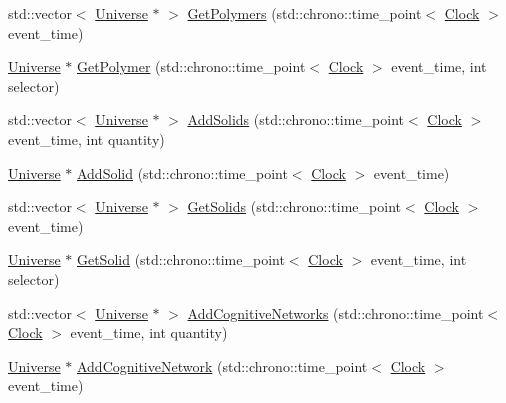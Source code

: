 \begin{DoxyCompactItemize}
\item 
std\+::vector$<$ \mbox{\hyperlink{classUniverse}{Universe}} $\ast$ $>$ \mbox{\hyperlink{classUniverse_aac5d1c1a3a3ba56c8ca7115a85b2c239}{Get\+Polymers}} (std\+::chrono\+::time\+\_\+point$<$ \mbox{\hyperlink{universe_8h_a0ef8d951d1ca5ab3cfaf7ab4c7a6fd80}{Clock}} $>$ event\+\_\+time)
\item 
\mbox{\hyperlink{classUniverse}{Universe}} $\ast$ \mbox{\hyperlink{classUniverse_a2d5d3924a7d7ffd2a5f47be9f137d86e}{Get\+Polymer}} (std\+::chrono\+::time\+\_\+point$<$ \mbox{\hyperlink{universe_8h_a0ef8d951d1ca5ab3cfaf7ab4c7a6fd80}{Clock}} $>$ event\+\_\+time, int selector)
\item 
std\+::vector$<$ \mbox{\hyperlink{classUniverse}{Universe}} $\ast$ $>$ \mbox{\hyperlink{classUniverse_a410d5ba2224fe90584b1f1aa5b38b41c}{Add\+Solids}} (std\+::chrono\+::time\+\_\+point$<$ \mbox{\hyperlink{universe_8h_a0ef8d951d1ca5ab3cfaf7ab4c7a6fd80}{Clock}} $>$ event\+\_\+time, int quantity)
\item 
\mbox{\hyperlink{classUniverse}{Universe}} $\ast$ \mbox{\hyperlink{classUniverse_a598799e2fcdf9ed60e83e9f5a61bfc05}{Add\+Solid}} (std\+::chrono\+::time\+\_\+point$<$ \mbox{\hyperlink{universe_8h_a0ef8d951d1ca5ab3cfaf7ab4c7a6fd80}{Clock}} $>$ event\+\_\+time)
\item 
std\+::vector$<$ \mbox{\hyperlink{classUniverse}{Universe}} $\ast$ $>$ \mbox{\hyperlink{classUniverse_a669fc068dd7820a5af309bfbe67199aa}{Get\+Solids}} (std\+::chrono\+::time\+\_\+point$<$ \mbox{\hyperlink{universe_8h_a0ef8d951d1ca5ab3cfaf7ab4c7a6fd80}{Clock}} $>$ event\+\_\+time)
\item 
\mbox{\hyperlink{classUniverse}{Universe}} $\ast$ \mbox{\hyperlink{classUniverse_a9f7b74fc21d45ddaa78aa18e9a337bcd}{Get\+Solid}} (std\+::chrono\+::time\+\_\+point$<$ \mbox{\hyperlink{universe_8h_a0ef8d951d1ca5ab3cfaf7ab4c7a6fd80}{Clock}} $>$ event\+\_\+time, int selector)
\item 
std\+::vector$<$ \mbox{\hyperlink{classUniverse}{Universe}} $\ast$ $>$ \mbox{\hyperlink{classUniverse_a5199f6c27b1a97c8b8c9847b8be686cf}{Add\+Cognitive\+Networks}} (std\+::chrono\+::time\+\_\+point$<$ \mbox{\hyperlink{universe_8h_a0ef8d951d1ca5ab3cfaf7ab4c7a6fd80}{Clock}} $>$ event\+\_\+time, int quantity)
\item 
\mbox{\hyperlink{classUniverse}{Universe}} $\ast$ \mbox{\hyperlink{classUniverse_ab682307c963836cd81b35b5604bd7064}{Add\+Cognitive\+Network}} (std\+::chrono\+::time\+\_\+point$<$ \mbox{\hyperlink{universe_8h_a0ef8d951d1ca5ab3cfaf7ab4c7a6fd80}{Clock}} $>$ event\+\_\+time)

\end{DoxyCompactItemize}
